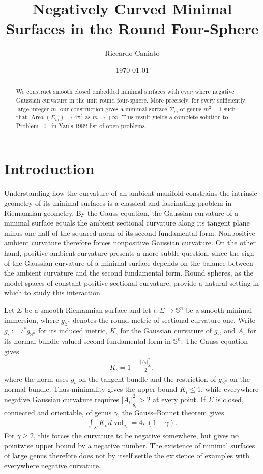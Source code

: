 \documentclass[a4paper,11pt,oneside,reqno]{amsart}
\title[Negatively Curved Minimal Surfaces in the Round Four-Sphere]{Negatively Curved Minimal Surfaces in the Round Four-Sphere}
\author[Riccardo Caniato]{Riccardo Caniato}
\date{\today}
\numberwithin{equation}{section}
\theoremstyle{definition}
\begin{document}
%
\begin{abstract}
    We construct smooth closed embedded minimal surfaces with everywhere negative Gaussian curvature in the unit round four-sphere. More precisely, for every sufficiently large integer $m$, our construction gives a minimal surface $\Sigma_m$ 
    of genus $m^2+1$ such that $\operatorname{Area}(\Sigma_m)\to 4\pi^2$ as $m\to+\infty$. This result yields a complete solution to Problem 101 in Yau's 1982 list of open problems.
\end{abstract}
%
\maketitle
%
\tableofcontents
%

\section{Introduction}
\label{sec:s4-introduction}
%
Understanding how the curvature of an ambient manifold constrains the intrinsic geometry of its minimal surfaces is a classical and fascinating problem in Riemannian geometry. By the Gauss equation, the Gaussian curvature of a minimal surface equals the ambient sectional curvature along its tangent plane minus one half of the squared norm of its second fundamental form. Nonpositive ambient curvature therefore forces nonpositive Gaussian curvature. On the other hand, positive ambient curvature presents a more subtle question, since the sign of the Gaussian curvature of a minimal surface depends on the balance between the ambient curvature and the second fundamental form. Round spheres, as the model spaces of constant positive sectional curvature, provide a natural setting in which to study this interaction.

Let $\Sigma$ be a smooth Riemannian surface and let $\iota:\Sigma\to\mathbb{S}^n$ be a smooth
minimal immersion, where $g_{\mathbb{S}^n}$ denotes the round
metric of sectional curvature one. Write
$g_\iota:=\iota^*g_{\mathbb{S}^n}$ for its induced metric,
$K_\iota$ for the Gaussian curvature of $g_\iota$, and
$A_\iota$ for its normal-bundle-valued second fundamental
form in $\mathbb{S}^n$. The Gauss equation gives
%
\begin{align*}
    K_\iota=1-\frac{|A_\iota|_{g_\iota}^2}{2},
\end{align*}
%
where the norm uses $g_\iota$ on the tangent bundle and the
restriction of $g_{\mathbb{S}^n}$ on the normal bundle.
Thus minimality gives the upper bound $K_\iota\leq1$,
while everywhere negative Gaussian curvature requires
$|A_\iota|_{g_\iota}^2>2$ at every point.
If $\Sigma$ is closed, connected and orientable, of genus
$\gamma$, the Gauss--Bonnet theorem gives
%
\begin{align*}
    \int_\Sigma K_\iota\,d\operatorname{vol}_{g_\iota}
    =4\pi(1-\gamma).
\end{align*}
%
For $\gamma\geq2$, this forces the curvature to be negative
somewhere, but gives no pointwise upper bound by a negative
number. The existence of minimal surfaces of large genus
therefore does not by itself settle the existence of examples
with everywhere negative curvature.
\end{document}
